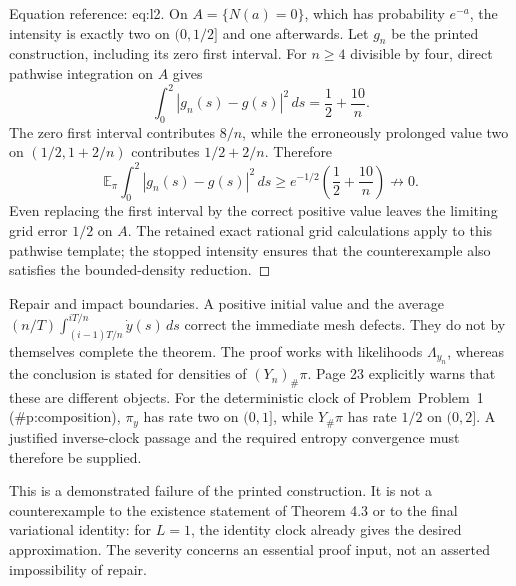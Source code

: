 \documentclass[10pt]{article}
\begin{document}
Equation reference: eq:l2. On \(A=\{N(a)=0\}\), which has probability \(e^{-a}\), the intensity is exactly two on \((0,1/2]\) and one afterwards. Let \(g_n\) be the printed construction, including its zero first interval. For \(n\geq4\) divisible by four, direct pathwise integration on \(A\) gives \[
\int_0^2|g_n(s)-g(s)|^2\,ds=\frac12+\frac{10}{n}.\] The zero first interval contributes \(8/n\), while the erroneously prolonged value two on \((1/2,1+2/n)\) contributes \(1/2+2/n\). Therefore \[\mathbb E_\pi\int_0^2|g_n(s)-g(s)|^2\,ds
\geq e^{-1/2}\left(\frac12+\frac{10}{n}\right)
\not\longrightarrow0.\] Even replacing the first interval by the correct positive value leaves the limiting grid error \(1/2\) on \(A\). The retained exact rational grid calculations apply to this pathwise template; the stopped intensity ensures that the counterexample also satisfies the bounded-density reduction. ◻\par
Repair and impact boundaries. A positive initial value and the average \((n/T)\int_{(i-1)T/n}^{iT/n}\dot y(s)\,ds\) correct the immediate mesh defects. They do not by themselves complete the theorem. The proof works with likelihoods \(\Lambda_{y_n}\), whereas the conclusion is stated for densities of \((Y_n)_\#\pi\). Page 23 explicitly warns that these are different objects. For the deterministic clock of Problem Problem 1 (\#p:composition), \(\pi_y\) has rate two on \((0,1]\), while \(Y_\#\pi\) has rate \(1/2\) on \((0,2]\). A justified inverse-clock passage and the required entropy convergence must therefore be supplied.\par
This is a demonstrated failure of the printed construction. It is not a counterexample to the existence statement of Theorem 4.3 or to the final variational identity: for \(L=1\), the identity clock already gives the desired approximation. The severity concerns an essential proof input, not an asserted impossibility of repair.\par
\end{document}
